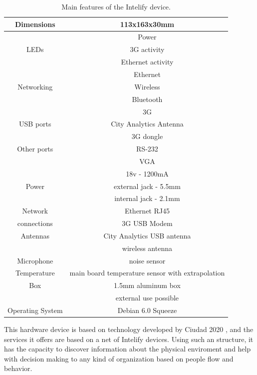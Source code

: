 \documentclass[preprint,authoryear,12pt]{elsarticle}
\begin{document}
\begin{table}[htpb]
\begin{center}
\begin{tabular}{|c|c|}
\hline
Dimensions & 113x163x30mm \\
\hline
     & Power             \\
LEDs & 3G activity       \\
     & Ethernet activity \\
\hline
           & Ethernet  \\
Networking & Wireless  \\
           & Bluetooth \\  
           & 3G        \\
\hline
USB ports & City Analytics Antenna \\
		  & 3G dongle              \\
\hline
Other ports & RS-232 \\
			& VGA    \\
\hline
 	  & 18v - 1200mA          \\
Power & external jack - 5.5mm \\
      & internal jack - 2.1mm \\
\hline
Network     & Ethernet RJ45 \\
connections & 3G USB Modem  \\
\hline
Antennas & City Analytics USB antenna \\
		 & wireless antenna \\
\hline
Microphone & noise sensor \\
\hline
Temperature & main board temperature sensor with extrapolation \\
\hline
Box & 1.5mm aluminum box \\
    & external use possible  \\
\hline
Operating System & Debian 6.0 Squeeze  \\
\hline
\end{tabular}
\end{center}
\caption{Main features of the Intelify device.}
\label{caracteristicas}
\end{table}

This hardware device is based on technology developed by Ciudad 2020 \cite{cityanalytics,Blobject}, and the services it offers are based on a net of Intelify devices. Using such an structure, it has the capacity to discover information about the physical enviroment and help with decision making to any kind of organization based on people flow and behavior.
\end{document}

